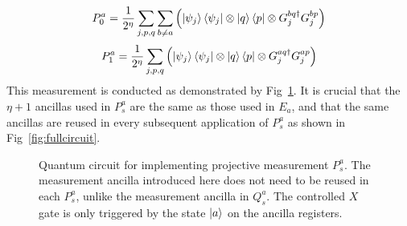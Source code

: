 \documentclass[aps,floatfix,10pt,amssymb,amsfont,amsmath,superscriptaddress,float,nofootinbib,longbibliography,nobalancelastpage,twocolumn]{revtex4-2}
\begin{document}
\begin{equation}
    P^a_0 = \frac{1}{2^{\eta}}\sum_{j,p,q} \sum_{b\neq a}\left( \ket{\psi_j}\bra{\psi_j} \otimes \ket{q}\bra{p} \otimes G_j^{bq\dagger}G_j^{bp} \right)
\end{equation}
\begin{equation}
    P^a_1 = \frac{1}{2^{\eta}}\sum_{j,p,q} \left( \ket{\psi_j}\bra{\psi_j} \otimes \ket{q}\bra{p} \otimes G_j^{aq\dagger}G_j^{ap} \right)
\end{equation}
This measurement is conducted as demonstrated by Fig~\ref{fig:Pcircuit}. It is crucial that the $\eta + 1$ ancillas used in $P_s^a$ are the same as those used in $E_a$, and that the same ancillas are reused in every subsequent application of $P_s^a$ as shown in Fig~\ref{fig:fullcircuit}.
\begin{figure}

\caption{Quantum circuit for implementing projective measurement $P_s^a$. The measurement ancilla introduced here does not need to be reused in each $P_s^a$, unlike the measurement ancilla in $Q_s^a$. The controlled $X$ gate is only triggered by the state $\ket{a}$ on the ancilla registers.}
\label{fig:Pcircuit}
\end{figure}
\end{document}
